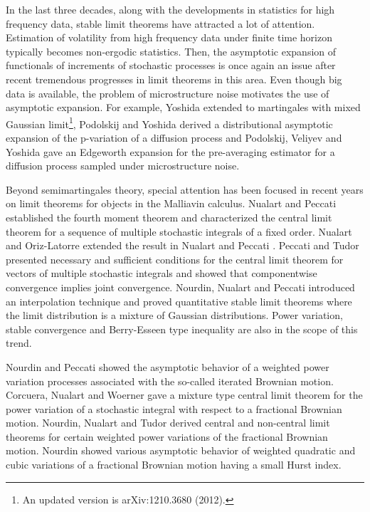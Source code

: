 \documentclass[a4paper]{article}
\numberwithin{equation}{section}
\begin{document}
In the last three decades, along with the developments in statistics for high frequency data, 
stable limit theorems have attracted a lot of attention. 
Estimation of volatility from high frequency data under finite time horizon typically becomes non-ergodic statistics. 
Then, the asymptotic expansion of functionals of increments of stochastic processes 
is once again an issue after recent tremendous progresses in limit theorems in this area. 
Even though big data is available, 
the problem of microstructure noise motivates  the use of asymptotic expansion. For example,
Yoshida \cite{yoshida2013martingale} extended \cite{Yoshida1997} to martingales with mixed Gaussian limit\footnote{An updated version is arXiv:1210.3680 (2012).}, 
Podolskij and Yoshida \cite{podolskij2016edgeworth} derived  a distributional asymptotic expansion of 
the p-variation of a diffusion process and
Podolskij, Veliyev and Yoshida \cite{podolskij2017edgeworth} gave an Edgeworth expansion 
for the pre-averaging estimator for a diffusion process sampled under microstructure noise. 


Beyond semimartingales theory, special attention has been focused in recent years 
on limit theorems for objects in the Malliavin calculus. 
Nualart and Peccati \cite{nualart2005central} 
established the fourth moment theorem and 
characterized the central limit theorem for a sequence of multiple stochastic integrals of a fixed order. 
Nualart and Oriz-Latorre \cite{nualart2008central} extended the result in Nualart and Peccati \cite{nualart2005central}. 
%
Peccati and Tudor \cite{peccati2005gaussian} presented necessary and sufficient conditions for 
the central limit theorem for vectors of multiple stochastic integrals and showed that 
componentwise convergence implies joint convergence. 
Nourdin, Nualart and Peccati \cite{nourdin2016quantitative} introduced an interpolation technique 
and proved quantitative stable limit theorems where the limit distribution is a mixture of 
Gaussian distributions. 
Power variation, stable convergence and Berry-Esseen type inequality are also in the scope of this trend. 
%
%

Nourdin and Peccati \cite{nourdin2008weighted} showed  
the asymptotic behavior of a weighted power variation processes associated
with the so-called iterated Brownian motion. 
Corcuera, Nualart and Woerner \cite{corcuera2006power} 
gave a mixture type central limit theorem for the power variation of a stochastic integral with respect to a fractional Brownian motion. 
Nourdin, Nualart and Tudor \cite{nourdin2010central} derived central and non-central limit theorems 
for certain weighted power variations of the fractional Brownian motion. 
Nourdin \cite{nourdin2008asymptotic} showed various asymptotic behavior of weighted quadratic and 
cubic variations of a fractional Brownian motion having a small Hurst index. 
\end{document}
